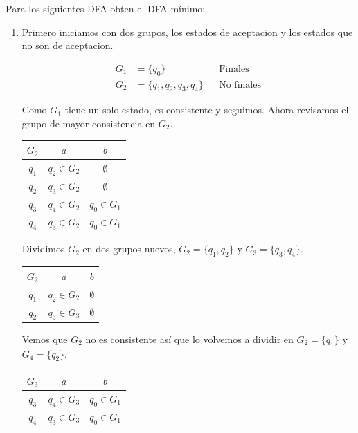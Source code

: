 \newpage
\begin{Pro}
Para los siguientes DFA obten el DFA mínimo:
\end{Pro}
\begin{enumerate}
\item 
Primero iniciamos con dos grupos, los estados de aceptacion y los estados que no son de aceptacion.

\begin{center}
\begin{align*}
    G_1 &= \{q_0\} && \text{Finales} \\
    G_2 &= \{q_1, q_2, q_3, q_4\} && \text{No finales}
\end{align*}
\end{center}

Como $G_1$ tiene un solo estado, es consistente y seguimos. 
Ahora revisamos el grupo de mayor consistencia en $G_2$. 


\begin{center}
\begin{tabular} {|c|c|c|}
    \hline
    $G_2$ & $a$ & $b$ \\ 
    \hline
    $q_1$ & $q_2 \in G_2$ & $\emptyset$ \\
    $q_2$ & $q_3 \in G_2$ & $\emptyset$ \\
    $q_3$ & $q_4 \in G_2$ & $q_0 \in G_1$ \\
    $q_4$ & $q_3 \in G_2$ & $q_0 \in G_1$ \\
    \hline
\end{tabular}
\end{center}

Dividimos $G_2$ en dos grupos nuevos, $G_2 = \{q_1, q_2\}$ y $G_3 = \{q_3, q_4\}$.

\begin{center}
\begin{tabular} {|c|c|c|}
    \hline
    $G_2$ & $a$ & $b$ \\ 
    \hline
    $q_1$ & $q_2 \in G_2$ & $\emptyset$ \\
    $q_2$ & $q_3 \in G_3$ & $\emptyset$ \\
    \hline
\end{tabular}
\end{center}

Vemos que $G_2$  no es consistente así que lo volvemos a dividir en $G_2 = \{q_1\}$ y $G_4 = \{q_2\}$.

\begin{center}
\begin{tabular} {|c|c|c|}
    \hline
    $G_3$ & $a$ & $b$ \\ 
    \hline
    $q_3$ & $q_4 \in G_3$ & $q_0 \in G_1$ \\
    $q_4$ & $q_3 \in G_3$ & $q_0 \in G_1$ \\
    \hline
\end{tabular}
\end{center}


\end{enumerate}
